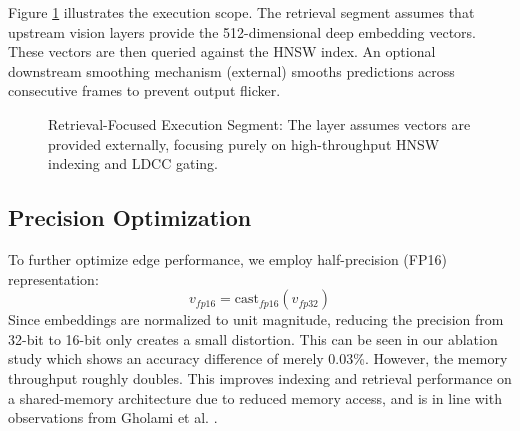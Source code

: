 \documentclass[conference]{IEEEtran}
\begin{document}
Figure \ref{fig:arch} illustrates the execution scope. The retrieval segment assumes that upstream vision layers provide the 512-dimensional deep embedding vectors. These vectors are then queried against the HNSW index. An optional downstream smoothing mechanism (external) smooths predictions across consecutive frames to prevent output flicker.

\begin{figure}[htbp]
\centering
{}
\caption{Retrieval-Focused Execution Segment: The layer assumes vectors are provided externally, focusing purely on high-throughput HNSW indexing and LDCC gating.}
\label{fig:arch}
\end{figure}

\subsection{Precision Optimization}
To further optimize edge performance, we employ half-precision (FP16) representation:
\begin{equation}
v_{fp16} = \text{cast}_{fp16}(v_{fp32})
\end{equation}
Since embeddings are normalized to unit magnitude, reducing the precision from 32-bit to 16-bit only creates a small distortion. This can be seen in our ablation study which shows an accuracy difference of merely 0.03\%. However, the memory throughput roughly doubles. This improves indexing and retrieval performance on a shared-memory architecture due to reduced memory access, and is in line with observations from Gholami et al. \cite{b14}.

\end{document}
